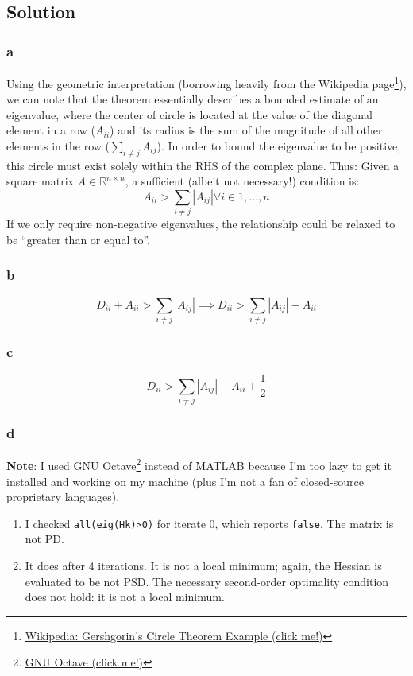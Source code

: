 \documentclass[11pt]{report}
\theoremstyle{definition}
\begin{document}
\subsection*{Solution}
\subsubsection*{a}
Using the geometric interpretation (borrowing heavily from the Wikipedia page\footnote{
	\href{https://en.wikipedia.org/wiki/Gershgorin_circle_theorem\#Example}
	{Wikipedia: Gershgorin's Circle Theorem Example (click me!)}
}), we can note that the theorem essentially describes a bounded estimate of an
eigenvalue, where the center of circle is located at the value of the diagonal
element in a row ($A_{ii}$) and its radius is the sum of the magnitude of all
other elements in the row ($\sum_{i\neq j}A_{ij}$). In order to bound the
eigenvalue to be positive, this circle must exist solely within the RHS of the
complex plane. Thus: Given a square matrix $A\in\mathbb{R}^{n\times n}$, a
sufficient (albeit not necessary!) condition is:
\[ A_{ii} > \sum_{i\neq j}|A_{ij}| \forall i \in 1,\ldots,n \]
If we only require non-negative eigenvalues, the relationship could be relaxed
to be ``greater than or equal to''.

\subsubsection*{b}
\[
	D_{ii} + A_{ii} > \sum_{i\neq j}|A_{ij}|
	\implies D_{ii} > \sum_{i\neq j}|A_{ij}| - A_{ii}
\]

\subsubsection*{c}
\[
	D_{ii} > \sum_{i\neq j}|A_{ij}| - A_{ii} + \frac{1}{2}
\]
\subsubsection*{d}
\textbf{Note}: I used GNU Octave\footnote{\href{https://octave.org/}{GNU Octave (click me!)}}
instead of MATLAB because I'm too lazy to get it installed and working on my machine (plus
I'm not a fan of closed-source proprietary languages).
\begin{enumerate}
	\item I checked \lstinline{all(eig(Hk)>0)} for iterate 0, which reports
	      \lstinline{false}. The matrix is not PD.
	\item It does after 4 iterations. It is not a local minimum; again, the
	      Hessian is evaluated to be not PSD. The necessary second-order optimality
	      condition does not hold: it is not a local minimum.
\end{enumerate}



\end{document}
